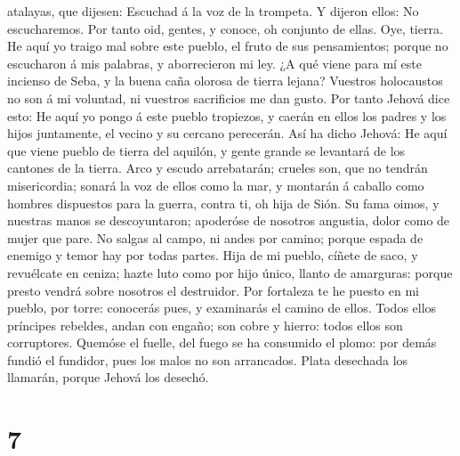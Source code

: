 atalayas, que dijesen: Escuchad á la voz de la trompeta. Y dijeron
ellos: No escucharemos.  Por tanto oid, gentes, y conoce,
oh conjunto de ellas.  Oye, tierra. He aquí yo traigo mal
sobre este pueblo, el fruto de sus pensamientos; porque no escucharon á
mis palabras, y aborrecieron mi ley.  ¿A qué viene para mí
este incienso de Seba, y la buena caña olorosa de tierra lejana?
Vuestros holocaustos no son á mi voluntad, ni vuestros sacrificios me
dan gusto.  Por tanto Jehová dice esto: He aquí yo pongo á
este pueblo tropiezos, y caerán en ellos los padres y los hijos
juntamente, el vecino y su cercano perecerán.  Así ha dicho
Jehová: He aquí que viene pueblo de tierra del aquilón, y gente grande
se levantará de los cantones de la tierra.  Arco y escudo
arrebatarán; crueles son, que no tendrán misericordia; sonará la voz de
ellos como la mar, y montarán á caballo como hombres dispuestos para la
guerra, contra ti, oh hija de Sión.  Su fama oimos, y
nuestras manos se descoyuntaron; apoderóse de nosotros angustia, dolor
como de mujer que pare.  No salgas al campo, ni andes por
camino; porque espada de enemigo y temor hay por todas partes.
 Hija de mi pueblo, cíñete de saco, y revuélcate en ceniza;
hazte luto como por hijo único, llanto de amarguras: porque presto
vendrá sobre nosotros el destruidor.  Por fortaleza te he
puesto en mi pueblo, por torre: conocerás pues, y examinarás el camino
de ellos.  Todos ellos príncipes rebeldes, andan con
engaño; son cobre y hierro: todos ellos son corruptores. 
Quemóse el fuelle, del fuego se ha consumido el plomo: por demás fundió
el fundidor, pues los malos no son arrancados.  Plata
desechada los llamarán, porque Jehová los desechó.

\hypertarget{section-6}{%
\section{7}\label{section-6}}

